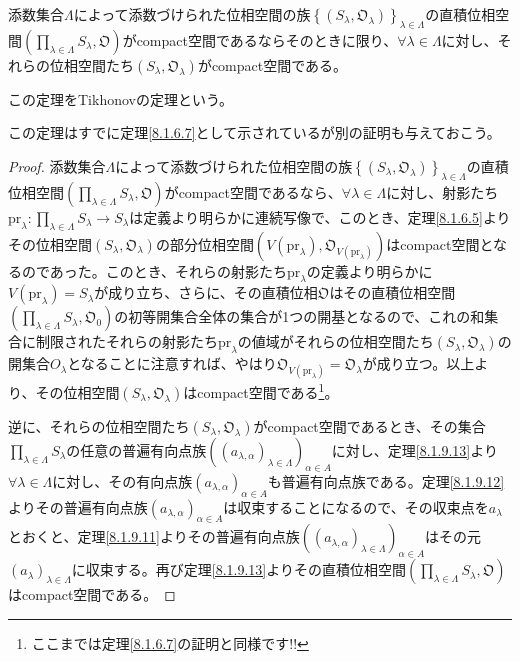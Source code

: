 \documentclass[dvipdfmx]{jsarticle}
\begin{document}
\begin{thm}[Tikhonovの定理]\label{8.1.9.14}
添数集合$\varLambda$によって添数づけられた位相空間の族$\left\{ \left( S_{\lambda},\mathfrak{O}_{\lambda} \right) \right\}_{\lambda \in \varLambda}$の直積位相空間$\left( \prod_{\lambda \in \varLambda} S_{\lambda},\mathfrak{O} \right)$がcompact空間であるならそのときに限り、$\forall\lambda \in \varLambda$に対し、それらの位相空間たち$\left( S_{\lambda},\mathfrak{O}_{\lambda} \right)$がcompact空間である。\par
この定理をTikhonovの定理という。
\end{thm}\par
この定理はすでに定理\ref{8.1.6.7}として示されているが別の証明も与えておこう。
\begin{proof}
添数集合$\varLambda$によって添数づけられた位相空間の族$\left\{ \left( S_{\lambda},\mathfrak{O}_{\lambda} \right) \right\}_{\lambda \in \varLambda}$の直積位相空間$\left( \prod_{\lambda \in \varLambda} S_{\lambda},\mathfrak{O} \right)$がcompact空間であるなら、$\forall\lambda \in \varLambda$に対し、射影たち${\mathrm{pr}}_{\lambda}:\prod_{\lambda \in \varLambda} S_{\lambda} \rightarrow S_{\lambda}$は定義より明らかに連続写像で、このとき、定理\ref{8.1.6.5}よりその位相空間$\left( S_{\lambda},\mathfrak{O}_{\lambda} \right)$の部分位相空間$\left( V\left( {\mathrm{pr}}_{\lambda} \right),\mathfrak{O}_{V\left( {\mathrm{pr}}_{\lambda} \right)} \right)$はcompact空間となるのであった。このとき、それらの射影たち${\mathrm{pr}}_{\lambda}$の定義より明らかに$V\left( {\mathrm{pr}}_{\lambda} \right) = S_{\lambda}$が成り立ち、さらに、その直積位相$\mathfrak{O}$はその直積位相空間$\left( \prod_{\lambda \in \varLambda} S_{\lambda},\mathfrak{O}_{0} \right)$の初等開集合全体の集合が1つの開基となるので、これの和集合に制限されたそれらの射影たち${\mathrm{pr}}_{\lambda}$の値域がそれらの位相空間たち$\left( S_{\lambda},\mathfrak{O}_{\lambda} \right)$の開集合$O_{\lambda}$となることに注意すれば、やはり$\mathfrak{O}_{V\left( {\mathrm{pr}}_{\lambda} \right)} = \mathfrak{O}_{\lambda}$が成り立つ。以上より、その位相空間$\left( S_{\lambda},\mathfrak{O}_{\lambda} \right)$はcompact空間である\footnote{ここまでは定理\ref{8.1.6.7}の証明と同様です!!}。\par
逆に、それらの位相空間たち$\left( S_{\lambda},\mathfrak{O}_{\lambda} \right)$がcompact空間であるとき、その集合$\prod_{\lambda \in \varLambda} S_{\lambda}$の任意の普遍有向点族$\left( \left( a_{\lambda,\alpha} \right)_{\lambda \in \varLambda} \right)_{\alpha \in A}$に対し、定理\ref{8.1.9.13}より$\forall\lambda \in \varLambda$に対し、その有向点族$\left( a_{\lambda,\alpha} \right)_{\alpha \in A}$も普遍有向点族である。定理\ref{8.1.9.12}よりその普遍有向点族$\left( a_{\lambda,\alpha} \right)_{\alpha \in A}$は収束することになるので、その収束点を$a_{\lambda}$とおくと、定理\ref{8.1.9.11}よりその普遍有向点族$\left( \left( a_{\lambda,\alpha} \right)_{\lambda \in \varLambda} \right)_{\alpha \in A}$はその元$\left( a_{\lambda} \right)_{\lambda \in \varLambda}$に収束する。再び定理\ref{8.1.9.13}よりその直積位相空間$\left( \prod_{\lambda \in \varLambda} S_{\lambda},\mathfrak{O} \right)$はcompact空間である。
\end{proof}
\end{document}
